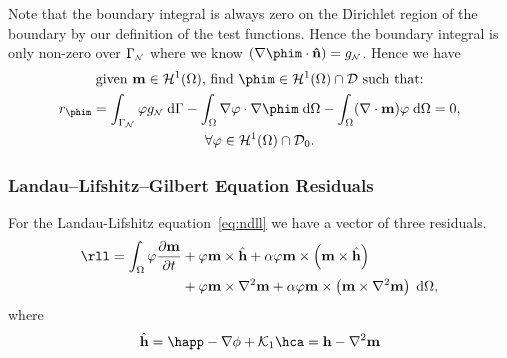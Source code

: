 Note that the boundary integral is always zero on the Dirichlet region of the boundary by our definition of the test functions. Hence the boundary integral is only non-zero over ${\Gamma}_{{\scriptscriptstyle{\mathcal{N}}}}$ where we know $(\nabla \phim \cdot \nv) = g_{\Neu}$. Hence we have
\begin{gather}
   \text{given $\mv \in \sob^1(\magd)$, find $\phim \in \sob^1(\magd) \cap \Dfs$ such that:} \notag \\
  r_{\phim} = \int_{\boundd_\Neu} \tbf g_\Neu \d \boundd
  - \int_\magd \nabla \tbf \cdot \nabla \phim \d \magd
  - \int_\magd (\nabla \cdot \mv) \tbf \d \magd = 0
  , \label{res:contphi} \\
  \forall \tbf \in \sob^1(\magd) \cap \Dfs_0. \notag
\end{gather}



\subsubsection{Landau--Lifshitz--Gilbert Equation Residuals}


For the Landau-Lifshitz equation~\eqref{eq:ndll} we have a vector of three residuals.
\begin{equation}
  \begin{aligned}
    \rll = \int_\magd \tbf \dmdt &+ \tbf \mv \times \hat{\hv}
    + \dampc \tbf \mv \times \left( \mv \times \hat{\hv} \right) \\
    &+  \tbf \mv \times \nabla^2 \mv
    + \dampc \tbf \mv \times \left(\mv \times \nabla^2 \mv\right) \d\magd,
    \label{res:contllg}
  \end{aligned}
\end{equation}
where
\begin{equation}
  \hat{\hv} = \happ - \nabla \phi + \kone \hca = \hv - \nabla^2 \mv
\end{equation}

